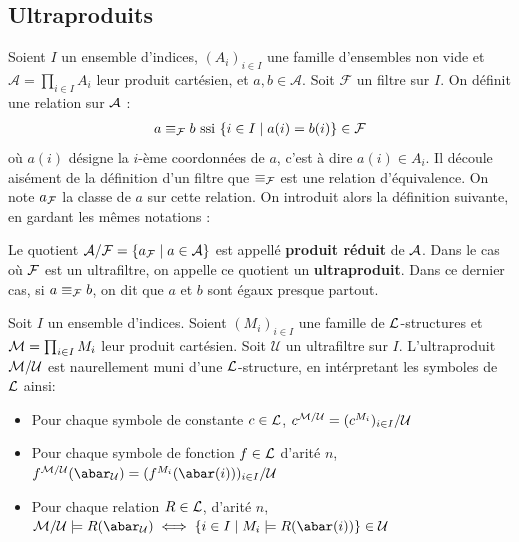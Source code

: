 \subsection{Ultraproduits}

\noindent Soient $I$ un ensemble d'indices, $(A_i)_{i \in I}$ une famille d'ensembles non vide et $\mathcal{A} = \prod_{i \in I} A_i$ leur produit cartésien,
et $a,b \in \mathcal{A}$. Soit $\mathcal{F}$ un filtre sur $I$. On définit une relation sur $\mathcal{A}$ :
\begin{align*}
a \equiv_{\mathcal{F}} b \text{ ssi } \{ i \in I \mid a(i) = b(i) \} \in \mathcal{F}
\end{align*}
où $a(i)$ désigne la $i$-ème coordonnées de $a$, c'est à dire $a(i) \in A_i$. Il découle aisément de la définition d'un filtre que $\equiv_{\mathcal{F}}$
est une relation d'équivalence. On note $a_{\mathcal{F}}$ la classe de $a$ sur cette relation.
On introduit alors la définition suivante, en gardant les mêmes notations :

\begin{defi}[Ultraproduits]
Le quotient $\mathcal{A} / \mathcal{F} = \{ a_{\mathcal{F}} \mid a \in \mathcal{A} \}$ est appellé \textbf{produit réduit} de $\mathcal{A}$. Dans le cas où $\mathcal{F}$ est un ultrafiltre,
on appelle ce quotient un \textbf{ultraproduit}. Dans ce dernier cas, si $a \equiv_{\mathcal{F}} b$, on dit que $a$ et $b$ sont égaux presque partout.
\end{defi}

\begin{defiprop}
Soit $I$ un ensemble d'indices. Soient $(M_i)_{i \in I}$ une famille de $\mathcal{L}$-structures et $\mathcal{M} = \prod_{i \in I} M_i$ leur produit cartésien.
Soit $\mathcal{U}$ un ultrafiltre sur $I$. L'ultraproduit $\mathcal{M}/\mathcal{U}$ est naurellement muni d'une $\mathcal{L}$-structure, en intérpretant les symboles de $\mathcal{L}$ ainsi:
\begin{itemize}
\item Pour chaque symbole de constante $c \in \mathcal{L}$, $c^{\mathcal{M}/\mathcal{U}} = (c^{M_i})_{i \in I}/\mathcal{U}$
\item Pour chaque symbole de fonction $f \in \mathcal{L}$ d'arité $n$, $f^{\cM/\mathcal{U}}(\abar_{\mathcal{U}}) = (f^{M_i}(\abar(i)))_{i \in I}/\mathcal{U}$
\item Pour chaque relation $R \in \mathcal{L}$, d'arité $n$, $\cM/\mathcal{U} \models R(\abar_{\mathcal{U}}) \iff \{ i \in I \mid
M_i \models R(\abar(i))\} \in \mathcal{U}$
\end{itemize}
\end{defiprop}

